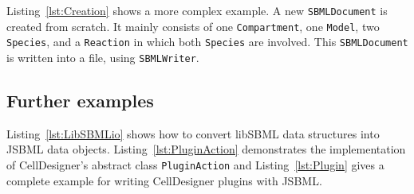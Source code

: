 
Listing~\vref{lst:Creation} shows a more complex example. A new
\texttt{SBMLDocument} is created from scratch. It mainly consists of one
\texttt{Compartment}, one \texttt{Model}, two \texttt{Species}, and a
\texttt{Reaction} in which both \texttt{Species} are involved. This
\texttt{SBMLDocument} is written into a file, using \texttt{SBMLWriter}.


\subsection{Further examples}

Listing~\vref{lst:LibSBMLio} shows how to convert libSBML data structures into
JSBML data objects. Listing~\vref{lst:PluginAction} demonstrates the
implementation of CellDesigner's abstract class \texttt{PluginAction} and
Listing~\vref{lst:Plugin} gives a complete example for writing CellDesigner
plugins with JSBML.
